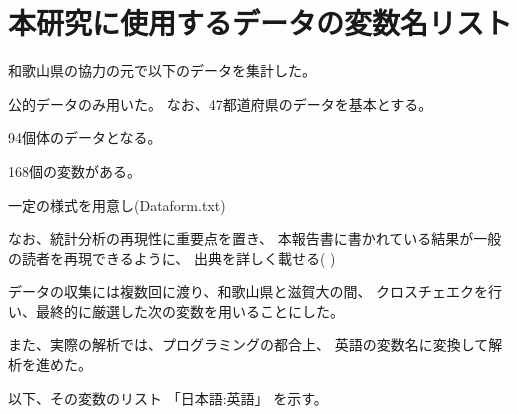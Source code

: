 \chapter{本研究に使用するデータの変数名リスト}
\label{datalist}

和歌山県の協力の元で以下のデータを集計した。



公的データのみ用いた。
なお、47都道府県のデータを基本とする。

94個体のデータとなる。

168個の変数がある。


一定の様式を用意し(Dataform.txt)

なお、統計分析の再現性に重要点を置き、
本報告書に書かれている結果が一般の読者を再現できるように、
出典を詳しく載せる(
)

データの収集には複数回に渡り、和歌山県と滋賀大の間、
クロスチェエクを行い、最終的に厳選した次の変数を用いることにした。

また、実際の解析では、プログラミングの都合上、
英語の変数名に変換して解析を進めた。


以下、その変数のリスト
「日本語:英語」
を示す。



